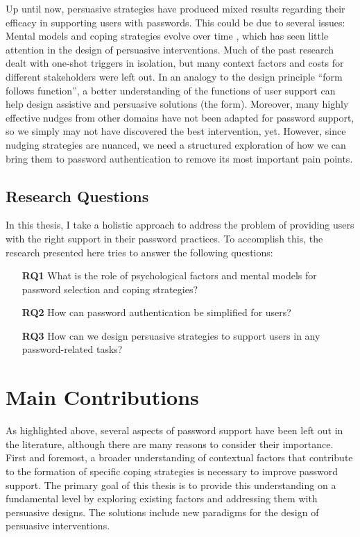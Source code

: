 Up until now, persuasive strategies have produced mixed results regarding their efficacy in supporting users with passwords. This could be due to several issues: Mental models and coping strategies evolve over time \cite{Stobert2014PasswordLifeCycle, Volkamer2013MentalModels}, which has seen little attention in the design of persuasive interventions. Much of the past research dealt with one-shot triggers in isolation, but many context factors and costs for different stakeholders were left out. In an analogy to the design principle ``form follows function'', a better understanding of the functions of user support can help design assistive and persuasive solutions (the form). Moreover, many highly effective nudges from other domains have not been adapted for password support, so we simply may not have discovered the best intervention, yet. However, since nudging strategies are nuanced, we need a structured exploration of how we can bring them to password authentication to remove its most important pain points.

\subsection{Research Questions}
In this thesis, I take a holistic approach to address the problem of providing users with the right support in their password practices. To accomplish this, the research presented here tries to answer the following questions:
\begin{itemize}
	\item[\textbf{RQ1}] What is the role of psychological factors and mental models for password selection and coping strategies?
	\item[\textbf{RQ2}] How can password authentication be simplified for users? 
	\item[\textbf{RQ3}] How can we design persuasive strategies to support users in any password-related tasks?
\end{itemize}

\section{Main Contributions}
As highlighted above, several aspects of password support have been left out in the literature, although there are many reasons to consider their importance. First and foremost, a broader understanding of contextual factors that contribute to the formation of specific coping strategies is necessary to improve password support. The primary goal of this thesis is to provide this understanding on a fundamental level by exploring existing factors and addressing them with persuasive designs. The solutions include new paradigms for the design of persuasive interventions.
